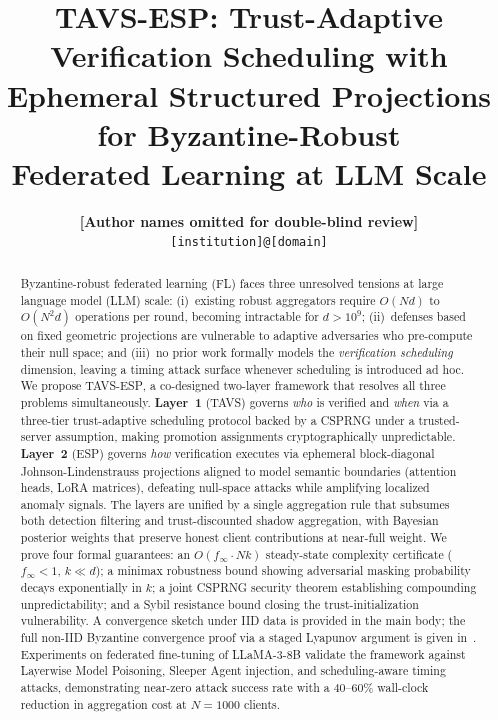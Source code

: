 \documentclass{article}
\title{%
  \textbf{TAVS-ESP: Trust-Adaptive Verification Scheduling with}\\
  \textbf{Ephemeral Structured Projections for Byzantine-Robust}\\
  \textbf{Federated Learning at LLM Scale}%
}
\author{%
  \textbf{[Author names omitted for double-blind review]}\\
  \texttt{[institution]@[domain]}
}
\newcommand{\finf}{f_{\infty}}       %
\newcommand{\TAVS}{\textsc{TAVS}}
\newcommand{\ESP}{\textsc{ESP}}
\newcommand{\TAVESP}{\textsc{TAVS-ESP}}
\begin{document}
\maketitle

\begin{abstract}
Byzantine-robust federated learning (FL) faces three unresolved tensions at
large language model (LLM) scale: (i)~existing robust aggregators require
$O(Nd)$ to $O(N^2 d)$ operations per round, becoming intractable for
$d > 10^9$; (ii)~defenses based on fixed geometric projections are vulnerable
to adaptive adversaries who pre-compute their null space; and (iii)~no prior
work formally models the \emph{verification scheduling} dimension, leaving a
timing attack surface whenever scheduling is introduced ad hoc.
We propose \TAVESP{}, a co-designed two-layer framework that resolves all three
problems simultaneously.
\textbf{Layer~1} (\TAVS{}) governs \emph{who} is verified and \emph{when}
via a three-tier trust-adaptive scheduling protocol backed by a CSPRNG under a
trusted-server assumption, making promotion assignments cryptographically
unpredictable.
\textbf{Layer~2} (\ESP{}) governs \emph{how} verification executes via
ephemeral block-diagonal Johnson-Lindenstrauss projections aligned to model
semantic boundaries (attention heads, LoRA matrices), defeating null-space
attacks while amplifying localized anomaly signals.
The layers are unified by a single aggregation rule that subsumes both
detection filtering and trust-discounted shadow aggregation, with Bayesian
posterior weights that preserve honest client contributions at near-full weight.
We prove four formal guarantees: an $O(\finf \cdot Nk)$ steady-state
complexity certificate ($\finf < 1$, $k \ll d$); a minimax robustness bound
showing adversarial masking probability decays exponentially in $k$; a joint
CSPRNG security theorem establishing compounding unpredictability; and a Sybil
resistance bound closing the trust-initialization vulnerability.
A convergence sketch under IID data is provided in the main body; the full
non-IID Byzantine convergence proof via a staged Lyapunov argument is given
in~.
Experiments on federated fine-tuning of LLaMA-3-8B validate the framework
against Layerwise Model Poisoning, Sleeper Agent injection, and scheduling-aware
timing attacks, demonstrating near-zero attack success rate with a
$40$--$60\%$ wall-clock reduction in aggregation cost at $N=1000$ clients.
\end{abstract}
\end{document}
